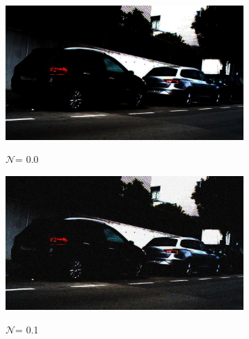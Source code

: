 \documentclass[a4paper]{ctexart}
\begin{document}
		\begin{figure}[htbp]
			\centering
			\begin{subfigure}{0.02\textwidth}
				\captionsetup{font=scriptsize}
				\caption*{}
				\vspace{-2pt}
			\end{subfigure}
			\begin{subfigure}{0.08\textwidth}
				\captionsetup{font=scriptsize}
				\caption*{$\mathcal{N}$= 0.0}
				\includegraphics[width=\linewidth]{picture/Edge Detection/degrade/RGB_001 Gamma=0.1, Gauss Noise=0.0}
				\label{fig: Gamma=0.1, Gauss Noise = 0.0}
			\end{subfigure}
			\begin{subfigure}{0.08\textwidth}
				\captionsetup{font=scriptsize}
				\caption*{$\mathcal{N}$= 0.1}
				\includegraphics[width=\linewidth]{picture/Edge Detection/degrade/RGB_001 Gamma=0.1, Gauss Noise=0.1}
				\label{fig：Gamma=0.1, Gauss Noise = 0.1}
			\end{subfigure}
			\begin{subfigure}{0.08\textwidth}
				\captionsetup{font=scriptsize}

\end{subfigure}
\end{figure}
\end{document}
